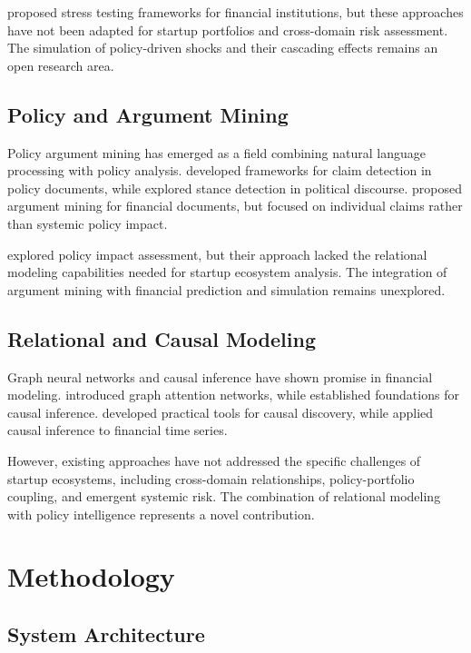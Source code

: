 \documentclass[conference]{IEEEtran}
\begin{document}
\cite{allen2010understanding} proposed stress testing frameworks for financial institutions, but these approaches have not been adapted for startup portfolios and cross-domain risk assessment. The simulation of policy-driven shocks and their cascading effects remains an open research area.

\subsection{Policy and Argument Mining}

Policy argument mining has emerged as a field combining natural language processing with policy analysis. \cite{lawrence2019argument} developed frameworks for claim detection in policy documents, while \cite{stede2018argument} explored stance detection in political discourse. \cite{habernal2018argument} proposed argument mining for financial documents, but focused on individual claims rather than systemic policy impact.

\cite{li2020policy} explored policy impact assessment, but their approach lacked the relational modeling capabilities needed for startup ecosystem analysis. The integration of argument mining with financial prediction and simulation remains unexplored.

\subsection{Relational and Causal Modeling}

Graph neural networks and causal inference have shown promise in financial modeling. \cite{velivckovic2017graph} introduced graph attention networks, while \cite{pearl2009causality} established foundations for causal inference. \cite{kalisch2012causal} developed practical tools for causal discovery, while \cite{sharma2019causal} applied causal inference to financial time series.

However, existing approaches have not addressed the specific challenges of startup ecosystems, including cross-domain relationships, policy-portfolio coupling, and emergent systemic risk. The combination of relational modeling with policy intelligence represents a novel contribution.

\section{Methodology}

\subsection{System Architecture}
\end{document}
